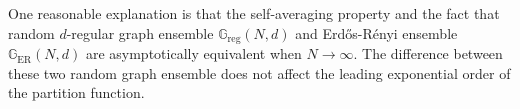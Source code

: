 \documentclass[a4paper,oneside,12pt]{article}
\begin{document}
\begin{solution}
\begin{enumerate}[(a)]
        One reasonable explanation is that the self-averaging property and the fact that random $ d $-regular graph ensemble $ \mathbb{G}_{\mathrm{reg}}(N, d) $ and Erd\H{o}s-R\'enyi ensemble $ \mathbb{G}_{\mathrm{ER}}(N, d) $ are asymptotically equivalent when $ N \to \infty $.
        The difference between these two random graph ensemble does not affect the leading exponential order of the partition function.



\end{enumerate}
\end{solution}
\end{document}
